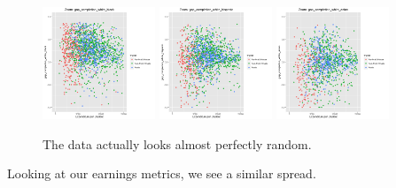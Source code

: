 \documentclass{article}
\begin{document}
\begin{figure}[H]
\centering
\includegraphics[width=0.3\textwidth]{../images/eda_scatterplots/gap_completion_white_black_zoom.png}
\includegraphics[width=0.3\textwidth]{../images/eda_scatterplots/gap_completion_white_hispanic_zoom.png}
\includegraphics[width=0.3\textwidth]{../images/eda_scatterplots/gap_completion_white_asian_zoom.png}
\caption{\label{fig:Completion Rates} The data actually looks almost perfectly random.}
\end{figure}

Looking at our earnings metrics, we see a similar spread.
\end{document}
